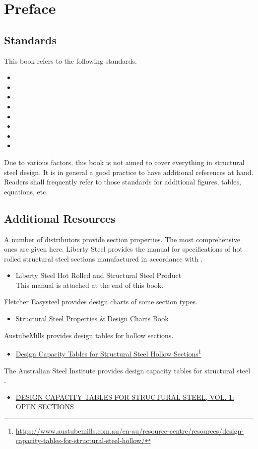 \chapter{Preface}
\section{Standards}
This book refers to the following standards.
\begin{itemize}
\item \ASNZSACTION{}
\item \NZSSTEEL{}
\item \ASNZSSTEEL{}
\item \ASNZSPLATE{}
\item \ASNZSCOLD{}
\item \ASNZSWELD{}
\item \ASNZSFASTERNER{}
\item \ANSI{}
\end{itemize}
Due to various factors, this book is not aimed to cover everything in structural steel design.
It is in general a good practice to have additional references at hand.
Readers shall frequently refer to those standards for additional figures, tables, equations, etc.
\section{Additional Resources}
A number of distributors provide section properties.
The most comprehensive ones are given here.
Liberty Steel provides the manual for specifications of hot rolled structural steel sections manufactured in accordance with \ASNZSSTEEL{}.
\begin{itemize}
\item Liberty Steel Hot Rolled and Structural Steel Product\\This manual is attached at the end of this book.
\end{itemize}
Fletcher Easysteel provides design charts of some section types.
\begin{itemize}
\item \href{run:./REF/STRUCTURAL.STEEL.PROPERTIES.DESIGN.CHARTS.BOOK.pdf}{Structural Steel Properties \& Design Charts Book}
\end{itemize}
AustubeMills provides design tables for hollow sections.
\begin{itemize}
\item \href{https://www.austubemills.com.au/en-au/resource-centre/resources/design-capacity-tables-for-structural-steel-hollow/}{Design Capacity Tables for Structural Steel Hollow Sections}\footnote{\url{https://www.austubemills.com.au/en-au/resource-centre/resources/design-capacity-tables-for-structural-steel-hollow/}}
\end{itemize}
The Australian Steel Institute provides design capacity tables for structural steel \citep{ASI2016}.
\begin{itemize}
\item \href{https://www.steel.org.au/resources/bookshop/products/design-capacity-tables-for-structural-steel,-vol/}{DESIGN CAPACITY TABLES FOR STRUCTURAL STEEL, VOL. 1: OPEN SECTIONS}
\end{itemize}

